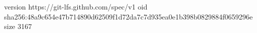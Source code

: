 version https://git-lfs.github.com/spec/v1
oid sha256:48a9c654e47b714890d62509f1d72da7c7d935ea0e1b398b0829884f0659296e
size 3167

